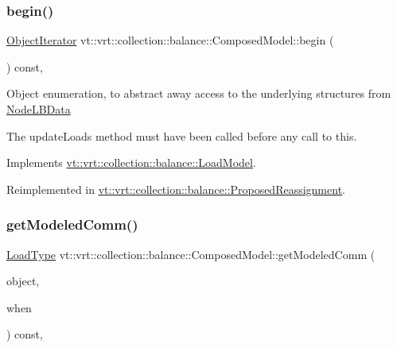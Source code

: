 \subsubsection{\texorpdfstring{begin()}{begin()}}
{\footnotesize\ttfamily \hyperlink{structvt_1_1vrt_1_1collection_1_1balance_1_1_object_iterator}{Object\+Iterator} vt\+::vrt\+::collection\+::balance\+::\+Composed\+Model\+::begin (\begin{DoxyParamCaption}{ }\end{DoxyParamCaption}) const\hspace{0.3cm}{\ttfamily [override]}, {\ttfamily [virtual]}}

Object enumeration, to abstract away access to the underlying structures from \hyperlink{structvt_1_1vrt_1_1collection_1_1balance_1_1_node_l_b_data}{Node\+L\+B\+Data}

The {\ttfamily update\+Loads} method must have been called before any call to this. 

Implements \hyperlink{structvt_1_1vrt_1_1collection_1_1balance_1_1_load_model_a085a13e3cfeff2beb88b49ddaed4ef8d}{vt\+::vrt\+::collection\+::balance\+::\+Load\+Model}.



Reimplemented in \hyperlink{structvt_1_1vrt_1_1collection_1_1balance_1_1_proposed_reassignment_ad7a65c6be802368df458f6005ef69d23}{vt\+::vrt\+::collection\+::balance\+::\+Proposed\+Reassignment}.

\mbox{\label{classvt_1_1vrt_1_1collection_1_1balance_1_1_composed_model_a500c3cd4c8e63cfdeea3edb5ddbcba47}} 
\subsubsection{\texorpdfstring{get\+Modeled\+Comm()}{getModeledComm()}}
{\footnotesize\ttfamily \hyperlink{namespacevt_a8fb51741340b87d7aaee0bef60e9896b}{Load\+Type} vt\+::vrt\+::collection\+::balance\+::\+Composed\+Model\+::get\+Modeled\+Comm (\begin{DoxyParamCaption}\item[{\hyperlink{namespacevt_1_1vrt_1_1collection_1_1balance_a9f5b53fafb270212279a4757d2c4cd28}{Element\+I\+D\+Struct}}]{object,  }\item[{\hyperlink{structvt_1_1vrt_1_1collection_1_1balance_1_1_phase_offset}{Phase\+Offset}}]{when }\end{DoxyParamCaption}) const\hspace{0.3cm}{\ttfamily [override]}, {\ttfamily [virtual]}}



